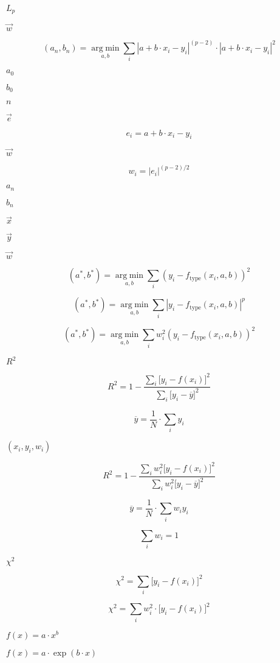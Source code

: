 \documentclass{article}
\begin{document}
$ L_p$
\pagebreak

$ \vec{w} $
\pagebreak

\[ (a_n,b_n)=\mathop{\mathrm{arg\;min}}\limits_{a,b}\sum\limits_i|a+b\cdot x_i-y_i|^{(p-2)}\cdot|a+b\cdot x_i-y_i|^2 \]
\pagebreak

$ a_0$
\pagebreak

$ b_0$
\pagebreak

$ n$
\pagebreak

$\vec{e}$
\pagebreak

\[ e_i = a+b\cdot x_i -y_i \]
\pagebreak

$\vec{w}$
\pagebreak

\[ w_i=|e_i|^{(p-2)/2} \]
\pagebreak

$ a_n$
\pagebreak

$ b_n$
\pagebreak

$ \vec{x}$
\pagebreak

$ \vec{y}$
\pagebreak

$ \vec{w}$
\pagebreak

\[ (a^\ast, b^\ast)=\mathop{\mathrm{arg\;min}}\limits_{a,b}\sum\limits_i\left(y_i-f_{\text{type}}(x_i,a,b)\right)^2 \]
\pagebreak

\[ (a^\ast, b^\ast)=\mathop{\mathrm{arg\;min}}\limits_{a,b}\sum\limits_i|y_i-f_{\text{type}}(x_i,a,b)|^p \]
\pagebreak

\[ (a^\ast, b^\ast)=\mathop{\mathrm{arg\;min}}\limits_{a,b}\sum\limits_iw_i^2\left(y_i-f_{\text{type}}(x_i,a,b)\right)^2 \]
\pagebreak

$ R^2 $
\pagebreak

\[ R^2=1-\frac{\sum_i\bigl[y_i-f(x_i)\bigr]^2}{\sum_i\bigl[y_i-\overline{y}\bigr]^2} \]
\pagebreak

\[ \overline{y}=\frac{1}{N}\cdot\sum_iy_i \]
\pagebreak

$ (x_i,y_i,w_i) $
\pagebreak

\[ R^2=1-\frac{\sum_iw_i^2\bigl[y_i-f(x_i)\bigr]^2}{\sum_iw_i^2\bigl[y_i-\overline{y}\bigr]^2} \]
\pagebreak

\[ \overline{y}=\frac{1}{N}\cdot\sum_iw_iy_i \]
\pagebreak

\[ \sum_iw_i=1 \]
\pagebreak

$ \chi^2 $
\pagebreak

\[ \chi^2=\sum_i\bigl[y_i-f(x_i)\bigr]^2 \]
\pagebreak

\[ \chi^2=\sum_iw_i^2\cdot\bigl[y_i-f(x_i)\bigr]^2 \]
\pagebreak

$ f(x)=a\cdot x^b $
\pagebreak

$ f(x)=a\cdot \exp(b\cdot x) $
\pagebreak
\end{document}
